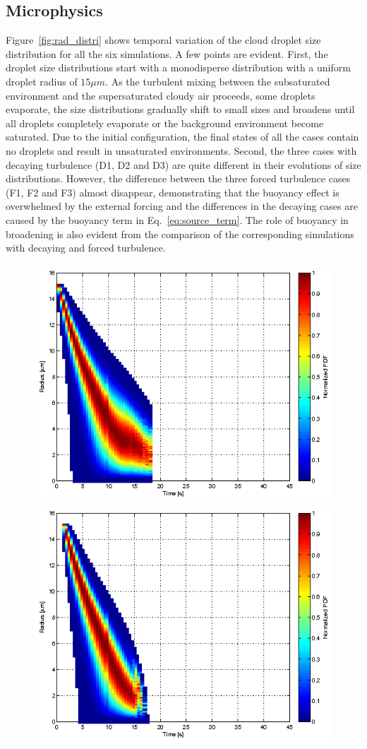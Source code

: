 \documentclass[draft,jgrga]{AGUTeX}
\newcommand{\Eq}[1]{Eq.~\eqref{#1}} \newcommand{\Fig}[1]{Figure~\ref{#1}}
\begin{document}
\begin{article}
\subsection{Microphysics}
\Fig{fig:rad_distri} shows temporal variation of the cloud droplet size distribution for all the six simulations. A few points are evident. First, the droplet size distributions start with a monodisperse distribution with a uniform droplet radius of $15\mu m$. As the turbulent mixing between the subsaturated environment and the supersaturated cloudy air proceeds, some droplets evaporate, the size distributions gradually shift to small sizes and broadens until all droplets completely evaporate or the background environment become saturated. Due to the initial configuration, the final states of all the cases contain no droplets and result in unsaturated environments. Second, the three cases with decaying turbulence (D1, D2 and D3) are quite different in their evolutions of size distributions. However, the difference between the three forced turbulence cases (F1, F2 and F3) almost disappear, demonstrating that the buoyancy effect is overwhelmed by the external forcing and the differences in the decaying cases are caused by the buoyancy term in \Eq{eq:source_term}. The role of buoyancy in broadening is also evident from the comparison of the corresponding simulations with decaying and forced turbulence.
\begin{figure}[!htbp]\centering
\includegraphics[width=0.48\linewidth]{Figures/pdf_radius_d1}
\includegraphics[width=0.48\linewidth]{Figures/pdf_radius_f1}\\

\end{figure}
\end{article}
\end{document}

